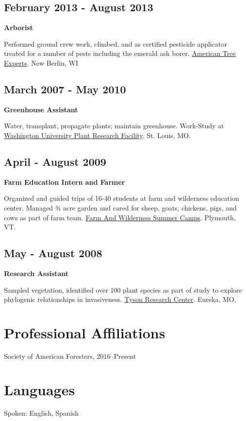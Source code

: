 \documentclass{article}
\begin{document}
\subsection*{February 2013 - August 2013}
\label{sec:org099da6c}
\textbf{Arborist}

Performed ground crew work, climbed, and as certified pesticide
applicator treated for a number of pests including the emerald ash
borer. \href{http://atetreecare.com/}{American Tree Experts}.  New Berlin, WI

\subsection*{March 2007 - May 2010}
\label{sec:org86af17a}
\textbf{Greenhouse Assistant}

Water, transplant, propagate plants; maintain greenhouse. Work-Study
at \href{http://biology4.wustl.edu/greenhouse/index.html}{Washington University Plant Research Facility}. St. Louis, MO.

\subsection*{April - August 2009}
\label{sec:org693a734}
\textbf{Farm Education Intern and Farmer}

Organized and guided trips of 16-40 students at farm and wilderness
education center. Managed 3⁄4 acre garden and cared for sheep, goats,
chickens, pigs, and cows as part of farm team.  \href{https://farmandwilderness.org/}{Farm And Wilderness
Summer Camps}. Plymouth, VT.

\subsection*{May - August 2008}
\label{sec:org2b5416d}
\textbf{Research Assistant}

Sampled vegetation, identified over 100 plant species as part of study
to explore phylogenic relationships in invasiveness.  \href{https://tyson.wustl.edu/2008}{Tyson Research
Center}. Eureka, MO.
\section*{Professional Affiliations}
\label{sec:org0bd82a6}
Society of American Foresters, 2016--Present

\section*{Languages}
\label{sec:org8930695}
Spoken: English, Spanish
\end{document}
